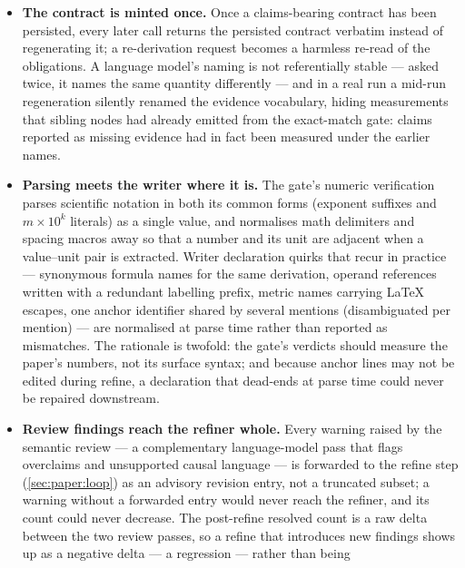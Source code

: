 \begin{itemize}
  \item \textbf{The contract is minted once.} Once a claims-bearing
        contract has been persisted, every later call returns the
        persisted contract verbatim instead of regenerating it; a
        re-derivation request becomes a harmless re-read of the
        obligations. A language model's naming is not referentially
        stable --- asked twice, it names the same quantity differently
        --- and in a real run a mid-run regeneration silently renamed
        the evidence vocabulary, hiding measurements that sibling
        nodes had already emitted from the exact-match gate: claims
        reported as missing evidence had in fact been measured under
        the earlier names.
  \item \textbf{Parsing meets the writer where it is.} The gate's
        numeric verification parses scientific notation in both its
        common forms (exponent suffixes and
        $m \times 10^{k}$ literals) as a single value, and normalises
        math delimiters and spacing macros away so that a number and
        its unit are adjacent when a value--unit pair is extracted.
        Writer declaration quirks that recur in practice ---
        synonymous formula names for the same derivation, operand
        references written with a redundant labelling prefix, metric
        names carrying \LaTeX{} escapes, one anchor identifier shared
        by several mentions (disambiguated per mention) --- are
        normalised at parse time rather than reported as mismatches.
        The rationale is twofold: the gate's verdicts should measure
        the paper's numbers, not its surface syntax; and because
        anchor lines may not be edited during refine, a declaration
        that dead-ends at parse time could never be repaired
        downstream.
  \item \textbf{Review findings reach the refiner whole.} Every
        warning raised by the semantic review --- a complementary
        language-model pass that flags overclaims and unsupported
        causal language --- is forwarded to the refine step
        (\cref{sec:paper:loop}) as an advisory revision entry, not a
        truncated subset; a warning without a forwarded entry would
        never reach the refiner, and its count could never decrease.
        The post-refine resolved count is a raw delta between the two
        review passes, so a refine that introduces new findings shows
        up as a negative delta --- a regression --- rather than being

\end{itemize}
